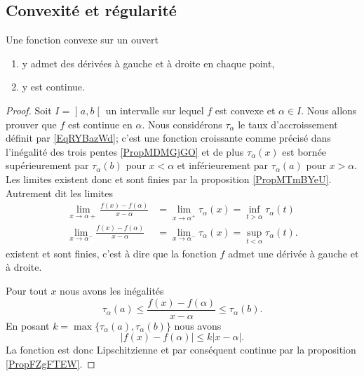 \subsection{Convexité et régularité}

\begin{lemma}   \label{LemKLTsHIQ}
    Une fonction convexe sur un ouvert
    \begin{enumerate}
        \item
            y admet des dérivées à gauche et à droite en chaque point,
        \item
            y est continue.
    \end{enumerate}
\end{lemma}

\begin{proof}
    Soit \( I=\mathopen] a , b \mathclose[\) un intervalle sur lequel \( f\) est convexe et \( \alpha\in I\). Nous allons prouver que \( f\) est continue en \( \alpha\). Nous considérons \( \tau_{\alpha}\) le taux d'accroissement définit par \eqref{EqRYBazWd}; c'est une fonction croissante comme précisé dans l'inégalité des trois pentes \ref{PropMDMGjGO} et de plus \( \tau_{\alpha}(x)\) est bornée supérieurement par \( \tau_{\alpha}(b)\) pour \( x<\alpha\) et inférieurement par \( \tau_{\alpha}(a)\) pour \( x>\alpha\). Les limites existent donc et sont finies par la proposition \ref{PropMTmBYeU}. Autrement dit les limites
        \begin{subequations}
            \begin{align}
                \lim_{x\to \alpha+} \frac{ f(x)-f(\alpha) }{ x-\alpha }&=\lim_{x\to \alpha^+} \tau_{\alpha}(x)=\inf_{t>\alpha}\tau_{\alpha}(t)\\
                \lim_{x\to \alpha^-} \frac{ f(x)-f(\alpha) }{ x-\alpha }&=\lim_{x\to \alpha^-} \tau_{\alpha}(x)=\sup_{t<\alpha}\tau_{\alpha}(t).
            \end{align}
        \end{subequations}
        existent et sont finies, c'est à dire que la fonction \( f\) admet une dérivée à gauche et à droite.

        Pour tout \( x\) nous avons les inégalités
        \begin{equation}
            \tau_{\alpha}(a)\leq \frac{ f(x)-f(\alpha) }{ x-\alpha }\leq \tau_{\alpha}(b).
        \end{equation}
        En posant \( k=\max\{ \tau_{\alpha}(a),\tau_{\alpha}(b) \}\) nous avons
        \begin{equation}
            \big| f(x)-f(\alpha) \big|\leq k| x-\alpha |.
        \end{equation}
        La fonction est donc Lipschitzienne et par conséquent continue par la proposition \ref{PropFZgFTEW}.
\end{proof}

